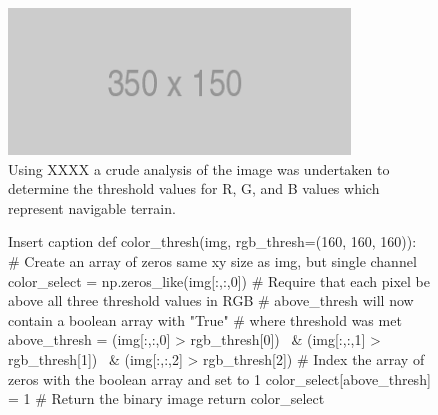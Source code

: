 \documentclass[a4paper]{article}
\begin{document}
\begin{figure}[h]
	\centering
	\includegraphics[scale=0.5]{placeholder}
	\caption{Using XXXX a crude analysis of the image was undertaken to determine the threshold values for R, G, and B values which represent navigable terrain.}
\end{figure}

\begin{figure}[h]\scriptsize
\begin{sexylisting}{Insert caption}
def color_thresh(img, rgb_thresh=(160, 160, 160)):
    # Create an array of zeros same xy size as img, but single channel
    color_select = np.zeros_like(img[:,:,0])
    # Require that each pixel be above all three threshold values in RGB
    # above_thresh will now contain a boolean array with "True"
    # where threshold was met
    above_thresh = (img[:,:,0] > rgb_thresh[0]) \
                & (img[:,:,1] > rgb_thresh[1]) \
                & (img[:,:,2] > rgb_thresh[2])
    # Index the array of zeros with the boolean array and set to 1
    color_select[above_thresh] = 1
    # Return the binary image
    return color_select
\end{sexylisting}
\end{figure}
\end{document}
